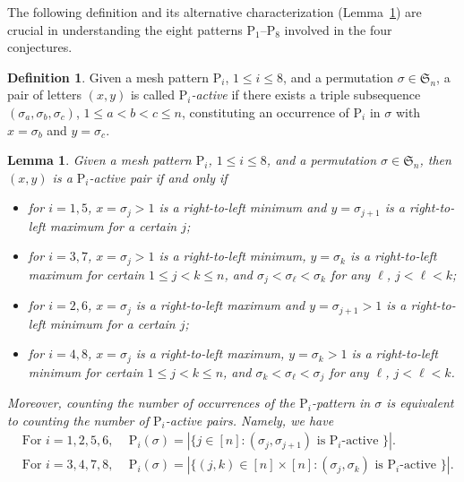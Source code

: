\documentclass[12pt,reqno]{article}
\numberwithin{equation}{section}
\theoremstyle{plain}
\newtheorem{lemma}[theorem]{Lemma}
\theoremstyle{definition}
\newtheorem{Def}[theorem]{Definition}
\def\fS{\mathfrak{S}}
\def\rP{\mathrm{P}}
\begin{document}
The following definition and its alternative characterization (Lemma~\ref{lem:pattern char}) are crucial in understanding the eight patterns $\rP_1$--$\rP_8$ involved in the four conjectures.
\begin{Def}\label{def:active pair}
Given a mesh pattern $\rP_i$, $1\le i\le 8$, and a permutation $\sigma\in\fS_n$, a pair of letters $(x,y)$ is called {\it $\rP_i$-active} if there exists a triple subsequence $(\sigma_a,\sigma_b,\sigma_c)$, $1\leq a<b<c\leq n$, constituting an occurrence of $\rP_i$ in $\sigma$ with $x=\sigma_b$ and $y=\sigma_c$. 
\end{Def}

\begin{lemma}\label{lem:pattern char}
Given a mesh pattern $\rP_i$, $1\le i\le 8$, and a permutation $\sigma\in\fS_n$, then $(x,y)$ is a $\rP_i$-active pair if and only if 
\begin{itemize}
	\item for $i=1,5$, $x=\sigma_j>1$ is a right-to-left minimum and $y=\sigma_{j+1}$ is a right-to-left maximum for a certain $j$;
	\item for $i=3,7$, $x=\sigma_j>1$ is a right-to-left minimum, $y=\sigma_{k}$ is a right-to-left maximum for certain $1\le j<k\le n$, and $\sigma_j<\sigma_{\ell}<\sigma_k$ for any $\ell$, $j<\ell<k$;
	\item for $i=2,6$, $x=\sigma_j$ is a right-to-left maximum and $y=\sigma_{j+1}>1$ is a right-to-left minimum for a certain $j$;
	\item for $i=4,8$, $x=\sigma_j$ is a right-to-left maximum, $y=\sigma_{k}>1$ is a right-to-left minimum for certain $1\le j<k\le n$, and $\sigma_k<\sigma_{\ell}<\sigma_j$ for any $\ell$, $j<\ell<k$.
\end{itemize}
Moreover, counting the number of occurrences of the $\rP_i$-pattern in $\sigma$ is equivalent to counting the number of $\rP_i$-active pairs. Namely, we have
\begin{align}
\label{id:pair=count-1}
&\text{For $i=1,2,5,6$, }\quad \rP_i(\sigma)=|\{j\in[n]:(\sigma_j,\sigma_{j+1}) \text{ is $\rP_i$-active }\}|.\\
&\text{For $i=3,4,7,8$, }\quad \rP_i(\sigma)=|\{(j,k)\in[n]\times[n]:(\sigma_j,\sigma_{k}) \text{ is $\rP_i$-active }\}|.\label{id:pair=count-2}
\end{align}
\end{lemma}
\end{document}

